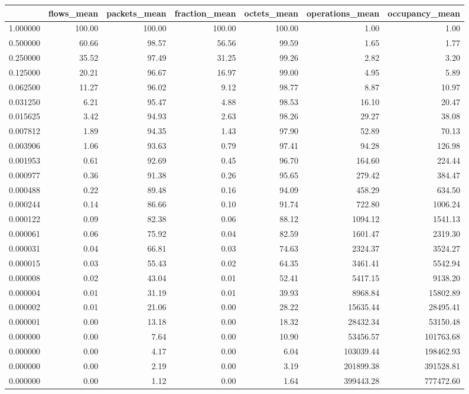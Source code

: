 \begin{tabular}{lrrrrrr}
\toprule
 & flows_mean & packets_mean & fraction_mean & octets_mean & operations_mean & occupancy_mean \\
\midrule
1.000000 & 100.00 & 100.00 & 100.00 & 100.00 & 1.00 & 1.00 \\
0.500000 & 60.66 & 98.57 & 56.56 & 99.59 & 1.65 & 1.77 \\
0.250000 & 35.52 & 97.49 & 31.25 & 99.26 & 2.82 & 3.20 \\
0.125000 & 20.21 & 96.67 & 16.97 & 99.00 & 4.95 & 5.89 \\
0.062500 & 11.27 & 96.02 & 9.12 & 98.77 & 8.87 & 10.97 \\
0.031250 & 6.21 & 95.47 & 4.88 & 98.53 & 16.10 & 20.47 \\
0.015625 & 3.42 & 94.93 & 2.63 & 98.26 & 29.27 & 38.08 \\
0.007812 & 1.89 & 94.35 & 1.43 & 97.90 & 52.89 & 70.13 \\
0.003906 & 1.06 & 93.63 & 0.79 & 97.41 & 94.28 & 126.98 \\
0.001953 & 0.61 & 92.69 & 0.45 & 96.70 & 164.60 & 224.44 \\
0.000977 & 0.36 & 91.38 & 0.26 & 95.65 & 279.42 & 384.47 \\
0.000488 & 0.22 & 89.48 & 0.16 & 94.09 & 458.29 & 634.50 \\
0.000244 & 0.14 & 86.66 & 0.10 & 91.74 & 722.80 & 1006.24 \\
0.000122 & 0.09 & 82.38 & 0.06 & 88.12 & 1094.12 & 1541.13 \\
0.000061 & 0.06 & 75.92 & 0.04 & 82.59 & 1601.47 & 2319.30 \\
0.000031 & 0.04 & 66.81 & 0.03 & 74.63 & 2324.37 & 3524.27 \\
0.000015 & 0.03 & 55.43 & 0.02 & 64.35 & 3461.41 & 5542.94 \\
0.000008 & 0.02 & 43.04 & 0.01 & 52.41 & 5417.15 & 9138.20 \\
0.000004 & 0.01 & 31.19 & 0.01 & 39.93 & 8968.84 & 15802.89 \\
0.000002 & 0.01 & 21.06 & 0.00 & 28.22 & 15635.44 & 28495.41 \\
0.000001 & 0.00 & 13.18 & 0.00 & 18.32 & 28432.34 & 53150.48 \\
0.000000 & 0.00 & 7.64 & 0.00 & 10.90 & 53456.57 & 101763.68 \\
0.000000 & 0.00 & 4.17 & 0.00 & 6.04 & 103039.44 & 198462.93 \\
0.000000 & 0.00 & 2.19 & 0.00 & 3.19 & 201899.38 & 391528.81 \\
0.000000 & 0.00 & 1.12 & 0.00 & 1.64 & 399443.28 & 777472.60 \\
\bottomrule
\end{tabular}
